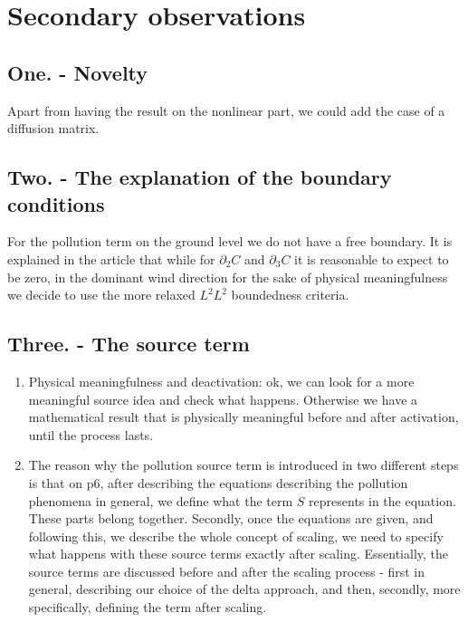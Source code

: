 \documentclass{article}
\begin{document}
\section{Secondary observations}

\subsection{One. - Novelty}

Apart from having the result on the nonlinear part, we could add the case of a diffusion matrix.

\subsection{Two. - The explanation of the boundary conditions}

For the pollution term on the ground level we do not have a free boundary. It is explained in the article that while for $\partial_2 C$ and $\partial_3 C$ it is reasonable to expect to be zero, in the dominant wind direction for the sake of physical meaningfulness we decide to use the more relaxed $L^2 L^2$ boundedness criteria.

\subsection{Three. - The source term}

\begin{enumerate}

\item Physical meaningfulness and deactivation: ok, we can look for a more meaningful source idea and check what happens. Otherwise we have a mathematical result that is physically meaningful before and after activation, until the process lasts.

\item The reason why the pollution source term is introduced in two different steps is that on p6, after describing the equations describing the pollution phenomena in general, we define what the term $S$ represents in the equation. These parts belong together. Secondly, once the equations are given, and following this, we describe the whole concept of scaling, we need to specify what happens with these source terms exactly after scaling. Essentially, the source terms are discussed before and after the scaling process - first in general, describing our choice of the delta approach, and then, secondly, more specifically, defining the term after scaling.

\end{enumerate}
\end{document}
